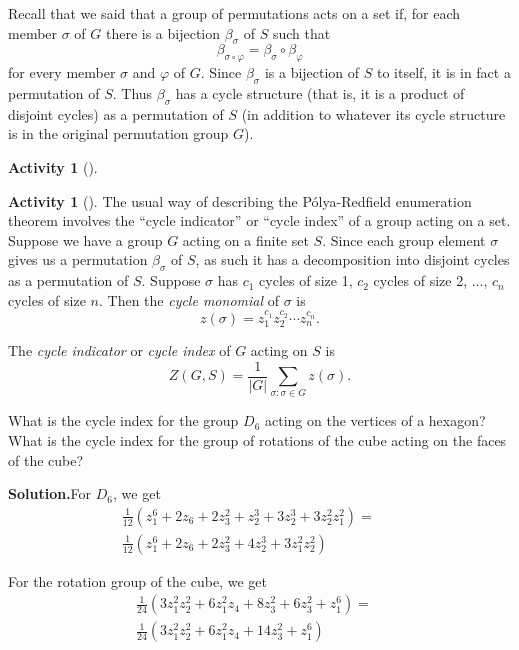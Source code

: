 \documentclass[10pt,]{book}
\theoremstyle{plain}
\theoremstyle{definition}
\newtheorem{activity}[project]{Activity}
\numberwithin{equation}{chapter}
\newcommand{\amp}{&}
\begin{document}
Recall that we said that a group of permutations acts on a set if, for each member \(\sigma\) of \(G\) there is a bijection \(\beta_{\sigma}\) of \(S\) such that%
\begin{equation*}
\beta_{\sigma\circ\varphi} = \beta_{\sigma}\circ\beta_{\varphi}
\end{equation*}
for every member \(\sigma\) and \(\varphi\) of \(G\). Since \(\beta_{\sigma}\) is a bijection of \(S\) to itself, it is in fact a permutation of \(S\). Thus \(\beta_{\sigma}\) has a cycle structure (that is, it is a product of disjoint cycles) as a permutation of \(S\) (in addition to whatever its cycle structure is in the original permutation group \(G\)).%
\begin{activity}[]\label{activity-325}
\end{activity}
\begin{activity}[]\label{activity-326}
The usual way of describing the Pólya-Redfield enumeration theorem involves the ``cycle indicator'' or ``cycle index'' of a group acting on a set. Suppose we have a group \(G\) acting on a finite set \(S\). Since each group element \(\sigma\) gives us a permutation \(\beta_{\sigma}\) of \(S\), as such it has a decomposition into disjoint cycles as a permutation of \(S\). Suppose \(\sigma\) has \(c_1\) cycles of size 1, \(c_2\) cycles of size 2, ..., \(c_n\) cycles of size \(n\). Then the \emph{cycle monomial} of \(\sigma\) is%
\begin{equation*}
z(\sigma) = z_1^{c_1}z_2^{c_2}\cdots z_n^{c_n}.
\end{equation*}
%
\par
The \emph{cycle indicator} or \emph{cycle index} of \(G\) acting on \(S\) is%
\begin{equation*}
Z(G,S) = \frac{1}{|G|}\sum_{\sigma: \sigma \in G} z(\sigma).
\end{equation*}
%
\par
What is the cycle index for the group \(D_6\) acting on the vertices of a hexagon? What is the cycle index for the group of rotations of the cube acting on the faces of the cube?%
\par\medskip\noindent%
\textbf{Solution.}\quad For \(D_6\), we get%
\begin{align*}
\frac{1}{12}\left(z_1^6
+2z_6+2z_3^2+z_2^3+3z_2^3+3z_2^2z_1^2\right)  =\amp\\
\frac{1}{12}\left(z_1^6
+2z_6+2z_3^2+4z_2^3+3z_1^2z_2^2\right)\amp \amp
\end{align*}
%
\par
For the rotation group of the cube, we get%
\begin{align*}
\frac{1}{24}\left(3z_1^2z_2^2+ 6z_1^2z_4+8z_3^2 +6z_3^2+z_1^6\right) =\amp\\
\frac{1}{24}\left(3z_1^2z_2^2+ 6z_1^2z_4 +14z_3^2+z_1^6\right) \amp
\end{align*}
%
\end{activity}
\end{document}
